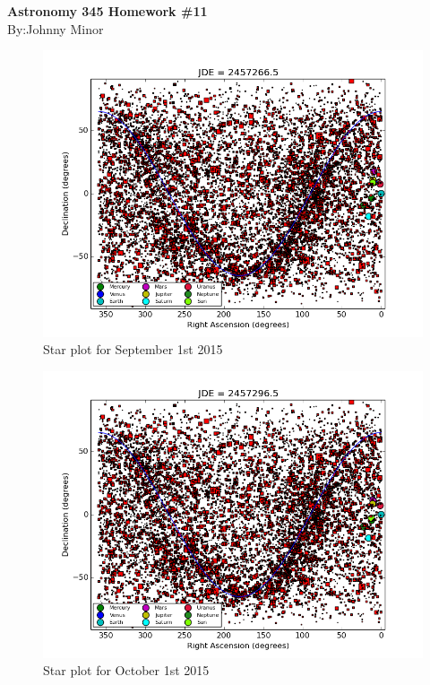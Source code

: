 \documentclass[11pt, leqno]{article}
\begin{document}
\begin{center}
\textbf{\large{Astronomy 345 Homework \#11 }} \\
By:Johnny Minor 
\end{center}

\begin{figure}[h!]
    \centering
    \includegraphics[width=\textwidth]{sept_1_2015_jde_2457266.png}
    \caption{Star plot for September 1st 2015}
    \label{fig:september1}
\end{figure}

\bigskip 

\begin{figure}[h!]
    \centering
    \includegraphics[width=\textwidth]{oct_1_2015_jde_2457296.png}
    \caption{Star plot for October 1st 2015}
    \label{fig:october1}
\end{figure}
\end{document}
